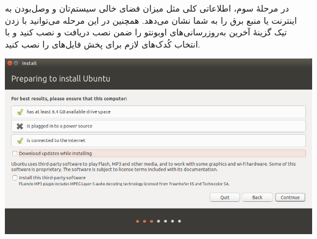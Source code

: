 در مرحلهٔ سوم، اطلاعاتی کلی مثل میزان فضای خالی سیستم‌تان و وصل‌بودن به اینترنت 
یا منبع برق را به شما نشان می‌دهد. همچنین در این مرحله می‌توانید با زدن تیک 
گزینهٔ  آخرین به‌روزرسانی‌های اوبونتو را 
ضمن نصب دریافت و نصب کنید و با انتخاب  
کُدک‌های لازم برای پخش فایل‌های  را نصب کنید.

\begin{center}
\includegraphics[scale=0.5]{pics/5.png}\\
\end{center}

